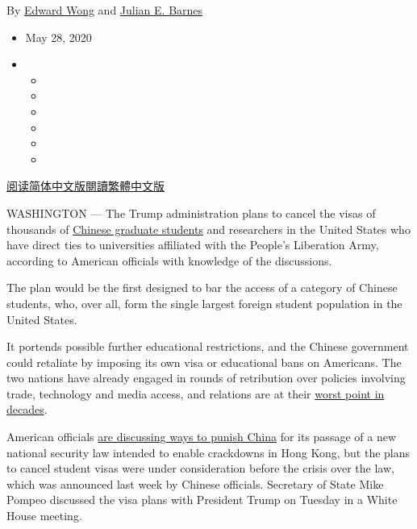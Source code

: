 By \href{https://www.nytimes3xbfgragh.onion/by/edward-wong}{Edward Wong}
and \href{https://www.nytimes3xbfgragh.onion/by/julian-e-barnes}{Julian
E. Barnes}

\begin{itemize}
\item
  May 28, 2020
\item
  \begin{itemize}
  \item
  \item
  \item
  \item
  \item
  \item
  \end{itemize}
\end{itemize}

\href{https://cn.nytimes3xbfgragh.onion/usa/20200529/china-hong-kong-trump-student-visas/}{阅读简体中文版}\href{https://cn.nytimes3xbfgragh.onion/usa/20200529/china-hong-kong-trump-student-visas/zh-hant/}{閱讀繁體中文版}

WASHINGTON --- The Trump administration plans to cancel the visas of
thousands of
\href{https://www.nytimes3xbfgragh.onion/2017/12/12/opinion/chinese-students-mental-health.html}{Chinese
graduate students} and researchers in the United States who have direct
ties to universities affiliated with the People's Liberation Army,
according to American officials with knowledge of the discussions.

The plan would be the first designed to bar the access of a category of
Chinese students, who, over all, form the single largest foreign student
population in the United States.

It portends possible further educational restrictions, and the Chinese
government could retaliate by imposing its own visa or educational bans
on Americans. The two nations have already engaged in rounds of
retribution over policies involving trade, technology and media access,
and relations are at their
\href{https://www.nytimes3xbfgragh.onion/2020/03/22/us/politics/coronavirus-us-china.html}{worst
point in decades}.

American officials
\href{https://www.nytimes3xbfgragh.onion/2020/05/27/us/politics/china-hong-kong-pompeo-trade.html}{are
discussing ways to punish China} for its passage of a new national
security law intended to enable crackdowns in Hong Kong, but the plans
to cancel student visas were under consideration before the crisis over
the law, which was announced last week by Chinese officials. Secretary
of State Mike Pompeo discussed the visa plans with President Trump on
Tuesday in a White House meeting.


